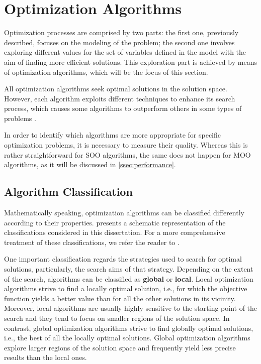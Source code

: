 \section{Optimization Algorithms}
\label{sec:optimizationalgorithms}
	Optimization processes are comprised by two parts: the first one, previously described, focuses on the modeling of the problem; the second one involves exploring different values for the set of variables defined in the model with the aim of finding more efficient solutions. This exploration part is achieved by means of optimization algorithms, which will be the focus of this section. 
	
	All optimization algorithms seek optimal solutions in the solution space. However, each algorithm exploits different techniques to enhance its search process, which causes some algorithms to outperform others in some types of problems \cite{Wolpert1997NFLT}.
	
	In order to identify which algorithms are more appropriate for specific optimization problems, it is necessary to measure their quality. Whereas this is rather straightforward for \ac{SOO} algorithms, the same does not happen for \ac{MOO} algorithms, as it will be discussed in \cref{ssec:performance}.
	
	\subsection{Algorithm Classification}	
	Mathematically speaking, optimization algorithms can be classified differently according to their properties.  presents a schematic representation of the classifications considered in this dissertation. For a more comprehensive treatment of these classifications, we refer the reader to \cite{Koziel2011, Nocedal2011NumericalOptimization}.
	
	One important classification regards the strategies used to search for optimal solutions, particularly, the search aims of that strategy. Depending on the extent of the search, algorithms can be classified as \textbf{global} or \textbf{local}. Local optimization algorithms strive to find a locally optimal solution, i.e., for which the objective function yields a better value than for all the other solutions in its vicinity. Moreover, local algorithms are usually highly sensitive to the starting point of the search and they tend to focus on smaller regions of the solution space. In contrast, global optimization algorithms strive to find globally optimal solutions, i.e., the best of all the locally optimal solutions. Global optimization algorithms explore larger regions of the solution space and frequently yield less precise results than the local ones.
	
